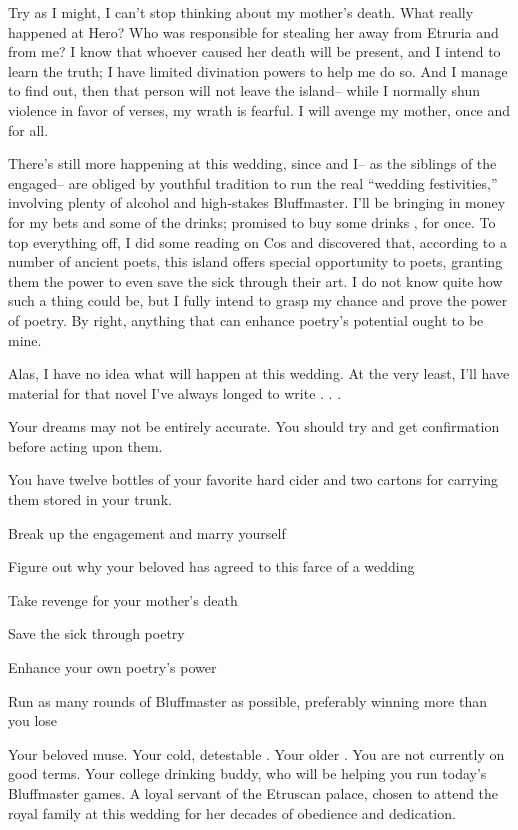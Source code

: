 \documentclass[char]{Kos}
\begin{document}
Try as I might, I can't stop thinking about my mother's death. What really happened at Hero? Who was responsible for stealing her away from Etruria and from me? I know that whoever caused her death will be present, and I intend to learn the truth; I have limited divination powers to help me do so. And I manage to find out, then that person will not leave the island-- while I normally shun violence in favor of verses, my wrath is fearful. I will avenge my mother, once and for all.

There's still more happening at this wedding, since \cWard{} and I-- as the siblings of the engaged-- are obliged by youthful tradition to run the real ``wedding festivities,'' involving plenty of alcohol and high-stakes Bluffmaster. I'll be bringing in money for my bets and some of the drinks; \cWard{} promised to buy some drinks \cWard{\themself}, for once. To top everything off, I did some reading on Cos and discovered that, according to a number of ancient poets, this island offers special opportunity to poets, granting them the power to even save the sick through their art. I do not know quite how such a thing could be, but I fully intend to grasp my chance and prove the power of poetry. By right, anything that can enhance poetry's potential ought to be mine.

Alas, I have no idea what will happen at this wedding. At the very least, I'll have material for that novel I've always longed to write . . . 


\begin{itemz}[Notes]
  \item Your dreams may not be entirely accurate. You should try and get confirmation before acting upon them.
  \item You have twelve bottles of your favorite hard cider and two cartons for carrying them stored in your trunk.
\end{itemz}

\begin{itemz}[Goals]
\item Break up the engagement and marry \cBride{} yourself
\item Figure out why your beloved \cBride{} has agreed to this farce of a wedding
\item Take revenge for your mother's death
\item Save the sick through poetry
\item Enhance your own poetry's power
\item Run as many rounds of Bluffmaster as possible, preferably winning more than you lose
\end{itemz}


\begin{contacts}
\contact{\cBride{}} Your beloved muse.
\contact{\cEtruriaKing{}} Your cold, detestable \cEtruriaKing{\parent}.
\contact{\cGroom{}} Your older \cGroom{\sibling}. You are not currently on good terms.
\contact{\cWard{}} Your college drinking buddy, who will be helping you run today's Bluffmaster games.
\contact{\cAssassin{}} A loyal servant of the Etruscan palace, chosen to attend the royal family at this wedding for her decades of obedience and dedication.
\end{contacts} 
\end{document}
